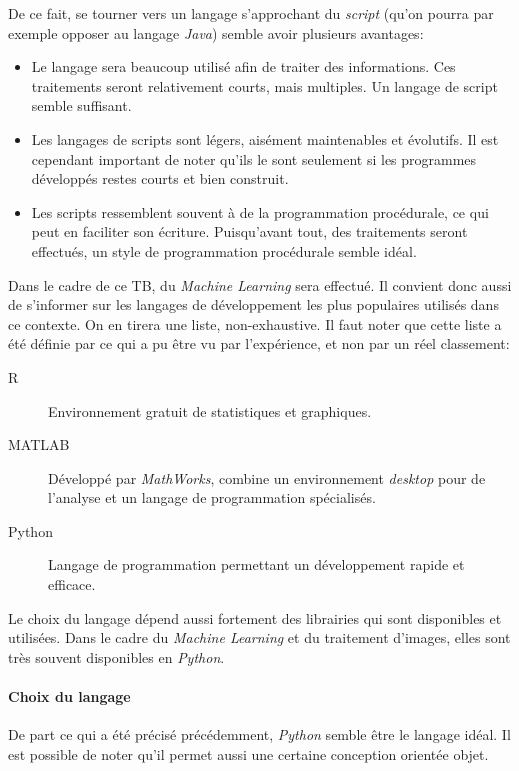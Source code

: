 De ce fait, se tourner vers un langage s'approchant du \textit{script} (qu'on pourra par exemple opposer au langage \textit{Java}) semble avoir plusieurs avantages:
\begin{itemize}
    \item Le langage sera beaucoup utilisé afin de traiter des informations. Ces traitements seront relativement courts, mais multiples. Un langage de script semble suffisant.
    \item Les langages de scripts sont légers, aisément maintenables et évolutifs. Il est cependant important de noter qu'ils le sont seulement si les programmes développés restes courts et bien construit. 
    \item Les scripts ressemblent souvent à de la programmation procédurale, ce qui peut en faciliter son écriture. Puisqu'avant tout, des traitements seront effectués, un style de programmation procédurale semble idéal.
\end{itemize}

Dans le cadre de ce TB, du \textit{Machine Learning} sera effectué. Il convient donc aussi de s'informer sur les langages de développement les plus populaires utilisés dans ce contexte. On en tirera une liste, non-exhaustive. Il faut noter que cette liste a été définie par ce qui a pu être vu par l'expérience, et non par un réel classement:
\begin{description}
    \item[R] Environnement gratuit de statistiques et graphiques.\autocite{lang:R}
    \item[MATLAB] Développé par \textit{MathWorks}, combine un environnement \textit{desktop} pour de l'analyse et un langage de programmation spécialisés.\autocite{lang:matlab}
    \item[Python] Langage de programmation permettant un développement rapide et efficace. \autocite{lang:python}
\end{description}

Le choix du langage dépend aussi fortement des librairies qui sont disponibles et utilisées. Dans le cadre du \textit{Machine Learning} et du traitement d'images, elles sont très souvent disponibles en \textit{Python}.

\paragraph{Choix du langage}
De part ce qui a été précisé précédemment, \textit{Python} semble être le langage idéal. Il est possible de noter qu'il permet aussi une certaine conception orientée objet.

